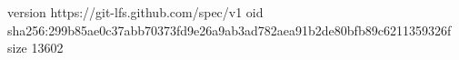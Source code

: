 version https://git-lfs.github.com/spec/v1
oid sha256:299b85ae0c37abb70373fd9e26a9ab3ad782aea91b2de80bfb89c6211359326f
size 13602
